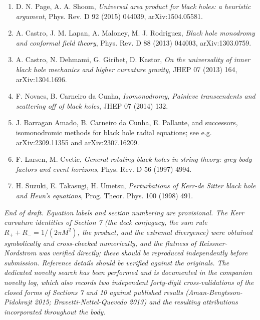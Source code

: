 \documentclass[11pt]{article}
\begin{document}
\begin{enumerate}
\item D. N. Page, A. A. Shoom, \emph{Universal area product for black holes: a heuristic argument}, Phys. Rev. D 92 (2015) 044039, arXiv:1504.05581.
\item A. Castro, J. M. Lapan, A. Maloney, M. J. Rodriguez, \emph{Black hole monodromy and conformal field theory}, Phys. Rev. D 88 (2013) 044003, arXiv:1303.0759.
\item A. Castro, N. Dehmami, G. Giribet, D. Kastor, \emph{On the universality of inner black hole mechanics and higher curvature gravity}, JHEP 07 (2013) 164, arXiv:1304.1696.
\item F. Novaes, B. Carneiro da Cunha, \emph{Isomonodromy, Painleve transcendents and scattering off of black holes}, JHEP 07 (2014) 132.
\item J. Barragan Amado, B. Carneiro da Cunha, E. Pallante, and successors, isomonodromic methods for black hole radial equations; see e.g. arXiv:2309.11355 and arXiv:2307.16209.
\item F. Larsen, M. Cvetic, \emph{General rotating black holes in string theory: grey body factors and event horizons}, Phys. Rev. D 56 (1997) 4994.
\item H. Suzuki, E. Takasugi, H. Umetsu, \emph{Perturbations of Kerr-de Sitter black hole and Heun's equations}, Prog. Theor. Phys. 100 (1998) 491.
\end{enumerate}



\emph{End of draft. Equation labels and section numbering are provisional. The Kerr curvature identities of Section 7 (the deck conjugacy, the sum rule $R_+ + R_- = 1/(2\pi M^2)$, the product, and the extremal divergence) were obtained symbolically and cross-checked numerically, and the flatness of Reissner-Nordstrom was verified directly; these should be reproduced independently before submission. Reference details should be verified against the originals. The dedicated novelty search has been performed and is documented in the companion novelty log, which also records two independent forty-digit cross-validations of the closed forms of Sections 7 and 10 against published results (Aman-Bengtsson-Pidokrajt 2015; Bravetti-Nettel-Quevedo 2013) and the resulting attributions incorporated throughout the body.}
\end{document}
